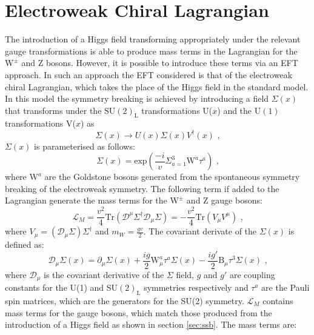 \section{Electroweak Chiral Lagrangian}
The introduction of a Higgs field transforming appropriately under the relevant gauge transformations is able to produce mass terms in the Lagrangian for the $\text{W}^{\pm}$ and Z bosons.  However, it is possible to introduce these terms via an EFT approach.  In such an approach the EFT considered is that of the electroweak chiral Lagrangian, which takes the place of the Higgs field in the standard model.  In this model the symmetry breaking is achieved by introducing a field $\Sigma(x)$ that transforms under the $\text{SU}(2)_{\text{L}}$ transformations U($x$) and the $\text{U}(1)$ transformations V($x$) as
%
\begin{equation}
\Sigma(x) \rightarrow U(x) \Sigma(x) V^{\dagger}(x) \text{ ,}
\end{equation}
%
\noindent $\Sigma(x)$ is parameterised as follows:
%
\begin{equation}
\Sigma(x) = \text{exp} (\frac{-i}{v} \Sigma^{3}_{a=1} \text{W}^{a}\tau^{a})\text{ ,}
\end{equation}
%
\noindent where $\text{W}^{a}$ are the Goldstone bosons generated from the spontaneous symmetry breaking of the electroweak symmetry.  The following term if added to the Lagrangian generate the mass terms for the $\text{W}^{\pm}$ and Z gauge bosons:
%
\begin{equation}
\mathcal{L}_{M} = \frac{v^{2}}{4} \text{Tr} (\mathcal{D}^{\mu} \Sigma^{\dagger} \mathcal{D}_{\mu} \Sigma) = -\frac{v^{2}}{4}\text{Tr}(V_{\mu} V^{\mu}) \text{ ,} 
\end{equation}
%
\noindent where $V_{\mu} = (\mathcal{D}_{\mu}\Sigma) \Sigma^{\dagger}$ and $m_{W} = \frac{gv}{2}$.  The covariant derivate of the $\Sigma(x)$ is defined as:
%
\begin{equation}
\mathcal{D}_{\mu} \Sigma(x) = \partial_{\mu} \Sigma(x) + \frac{ig}{2}\text{W}_{\mu}^{a}\tau^{a}\Sigma(x) - \frac{ig'}{2}\text{B}_{\mu}\tau^{3}\Sigma(x) \text{ ,}
\end{equation}
%
\noindent where $\mathcal{D}_{\mu}$ is the covariant derivative of the $\Sigma$ field, $g$ and $g'$ are coupling constants for the U(1) and SU$(2)_\text{L}$ symmetries respectively and $\tau^{a}$ are the Pauli spin matrices, which are the generators for the SU(2) symmetry.  $\mathcal{L}_{M}$ contains mass terms for the gauge bosons, which match those produced from the introduction of a Higgs field as shown in section \ref{sec:ssb}.  The mass terms are:
